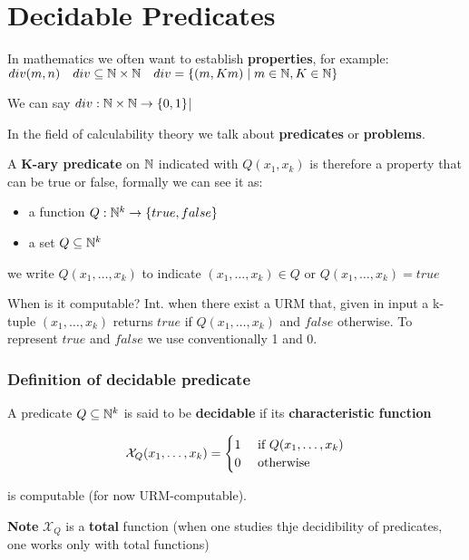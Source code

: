 \chapter{Decidable Predicates}

In mathematics we often want to establish \textbf{properties}, for example: $ div(m,n)  \quad  div \subseteq \mathbb{N} \times \mathbb{N} \quad  div = \{(m,Km) \mid m \in \mathbb{N}, K \in \mathbb{N} \} $

We can say $ div: \mathbb{N} \times \mathbb{N} \rightarrow \{0,1\} $|

In the field of calculability theory we talk about \textbf{predicates} or \textbf{problems}.

A \textbf{K-ary predicate} on $\mathbb{N} $ indicated with $Q(x_1,x_k)$ is therefore a property that can be true or false, formally we can see it as:

\begin{itemize}
\item a function $Q: \mathbb{N}^k\rightarrow \{true,false\}$
\item a set $Q \subseteq \mathbb{N}^k$
\end{itemize}

we write $Q(x_1,\dots,x_k)$ to indicate $(x_1,\dots,x_k) \in Q$ or $Q(x_1,\dots,x_k) = true$

When is it computable? Int. when there exist a URM that, given in input a k-tuple $(x_1,\dots,x_k)$ returns $true$ if $Q(x_1,\dots,x_k)$ and $false$ otherwise. To represent $true$ and $false$ we use conventionally 1 and 0.

\subsection{Definition of decidable predicate}

A predicate $Q \subseteq \mathbb{N}^k$ is said to be \textbf{decidable} if its \textbf{characteristic function}

\begin{equation*}
\mathcal{X}_Q(x_1,\dots,x_k) = \begin{cases}
1 & $ if $ Q(x_1,\dots,x_k) \\
0 & $ otherwise $
\end{cases}
\end{equation*}

is computable (for now URM-computable).

\textbf{Note} $\mathcal{X}_Q$ is a \textbf{total} function (when one studies thje decidibility of predicates, one works only with total functions)

